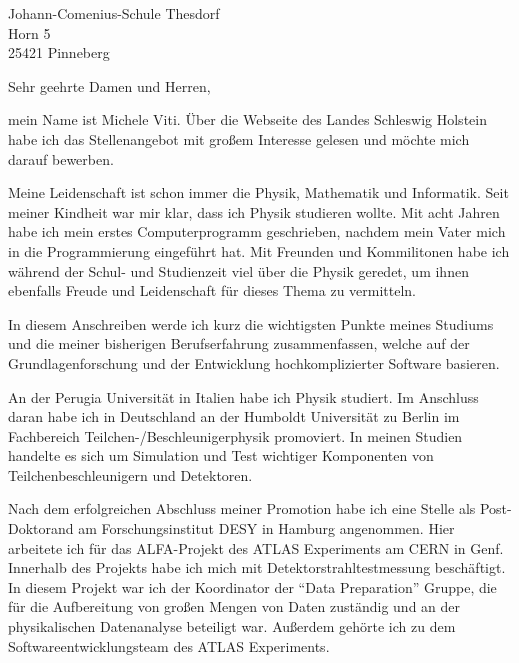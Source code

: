 \documentclass[ebner,paper=a4,fontsize=11pt,ngerman,BCOR=10mm]{scrlttr2}%
\begin{document}
\pagestyle{empty}

\begin{letter}{Johann-Comenius-Schule Thesdorf\\
Horn 5\\ 
25421 Pinneberg }


\opening{Sehr geehrte Damen und Herren,} 

mein Name ist Michele Viti. {\"U}ber die Webseite 
des Landes Schleswig Holstein habe
ich das Stellenangebot mit gro{\ss}em Interesse gelesen und m{\"o}chte mich darauf bewerben.

Meine Leidenschaft ist schon immer die Physik,  Mathematik und  Informatik.
Seit meiner Kindheit war mir klar, dass ich Physik studieren wollte. Mit acht Jahren habe ich mein erstes Computerprogramm
geschrieben, nachdem mein Vater mich in die Programmierung eingef{\"u}hrt hat.
Mit Freunden und Kommilitonen habe ich w{\"a}hrend der Schul- und Studienzeit viel {\"u}ber die Physik geredet, um ihnen ebenfalls Freude und Leidenschaft f{\"u}r dieses Thema zu vermitteln.

In diesem Anschreiben werde ich kurz die wichtigsten Punkte meines Studiums und die
meiner bisherigen Berufserfahrung zusammenfassen, welche auf der Grundlagenforschung und der Entwicklung hochkomplizierter Software basieren.

An der Perugia Universit{\"a}t in Italien habe ich Physik studiert. Im Anschluss daran habe ich in Deutschland an der Humboldt Universit{\"a}t zu Berlin im Fachbereich
Teilchen-/Beschleunigerphysik promoviert. In meinen Studien handelte es sich um
Simulation und Test wichtiger Komponenten von Teilchenbeschleunigern und Detektoren.

Nach dem erfolgreichen Abschluss meiner Promotion habe ich eine Stelle als Post-Doktorand am Forschungsinstitut DESY in Hamburg angenommen. Hier arbeitete
ich f{\"u}r das ALFA-Projekt des ATLAS Experiments am CERN in Genf. Innerhalb des
Projekts habe ich mich mit Detektorstrahltestmessung besch{\"a}ftigt. In diesem Projekt
war ich der Koordinator der  "`Data Preparation"' Gruppe, die f{\"u}r die Aufbereitung
von gro{\ss}en Mengen von Daten zust{\"a}ndig und an der physikalischen Datenanalyse
beteiligt war. Au{\ss}erdem geh{\"o}rte ich zu dem Softwareentwicklungsteam des ATLAS
Experiments.


\end{letter}
\end{document}
